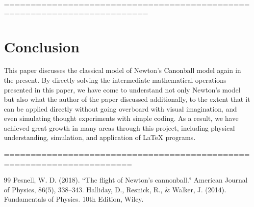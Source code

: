 \documentclass[11pt,letterpaper]{article}
\begin{document}
=========================================================================
\section{Conclusion}
This paper discusses the classical model of Newton's Canonball model again in the present. By directly solving the intermediate mathematical operations presented in this paper, we have come to understand not only Newton's model but also what the author of the paper discussed additionally, to the extent that it can be applied directly without going overboard with visual imagination, and even simulating thought experiments with simple coding. As a result, we have achieved great growth in many areas through this project, including physical understanding, simulation, and application of LaTeX programs.

======================================================================
\begin{thebibliography}{99}
Pesnell, W. D. (2018). “The flight of Newton’s cannonball.” American Journal of Physics, 86(5), 338–343. 
Halliday, D., Resnick, R., \& Walker, J. (2014). Fundamentals of Physics. 10th Edition, Wiley.
\end{thebibliography}
\end{document}
